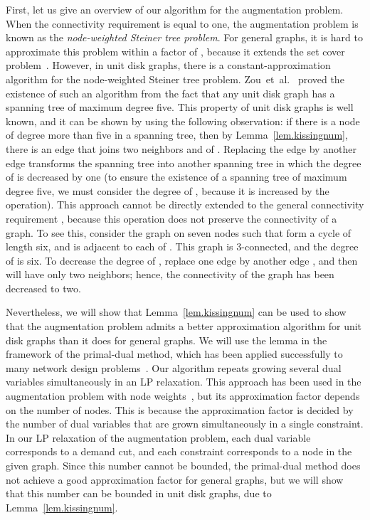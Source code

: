 \documentclass[11pt]{article}
\begin{document}
First, let us give an overview of our algorithm for the augmentation
problem.
When the connectivity requirement  is equal to one, 
the augmentation problem is known as the \emph{node-weighted Steiner
tree problem}.
For general graphs, it is hard to approximate this problem within a factor of ,
because it extends the set cover problem~\cite{KleinR95}.
However, in unit disk graphs, there is a constant-approximation
algorithm for the node-weighted Steiner tree problem.
Zou~et~al.~\cite{ZouLGW09} proved the existence of such an algorithm from the 
fact that
any unit disk graph has a spanning tree of maximum degree five.
This property of unit disk graphs is well known, and it can be shown by
using the following observation: if there is a node  of degree more than
five in a spanning tree, then by Lemma~\ref{lem.kissingnum},
there is an edge  that joins two neighbors  and  of .
Replacing the edge  by another edge  transforms the spanning tree into
another spanning tree in which the degree of  is decreased by one
(to ensure the existence of a spanning tree of maximum degree five, we must consider the degree of , because it is increased by the operation).
This approach cannot be directly extended to the general connectivity
requirement , because this operation does not preserve the connectivity
of a graph.
To see this, consider the graph on seven nodes  such that
 form a cycle of length six, and  is adjacent to each of
.
This graph is 3-connected, and the degree of  is six. To decrease the
degree of , replace one edge  by another edge , and 
then  will have only two neighbors; hence, the
connectivity of the graph has been decreased to two.

Nevertheless, we will show that Lemma~\ref{lem.kissingnum} can be used to show 
that the augmentation problem admits a better approximation algorithm for unit disk graphs
than it does for general graphs. We will use the lemma in the framework
of the primal-dual method,
which has been applied successfully to many
network design problems~\cite{goemans1997primal}.
Our algorithm repeats growing several dual
variables simultaneously in an LP relaxation.
This approach has been used in the augmentation
problem with node weights~\cite{ChekuriEV12,Fukunaga15},
but 
its approximation factor depends on the number of nodes.
This is because the approximation factor is decided by the number of
dual variables that
are grown simultaneously in a single constraint.
In our LP relaxation of the augmentation problem, each dual variable
corresponds to
a demand cut, and each constraint corresponds to
a node in the given graph.
Since this number cannot be bounded, the primal-dual
method does not achieve a good approximation factor for
general graphs, but we will show that this number can be bounded in unit disk graphs, due to Lemma~\ref{lem.kissingnum}.
\end{document}
